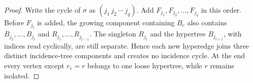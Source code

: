\documentclass[10pt,a4paper]{amsart}
\begin{document}
\begin{proof}
Write the cycle of $\sigma$ as $(j_1\,j_2\,\cdots\,j_q)$. Add
$F_{j_1},F_{j_2},\ldots,F_{j_q}$ in this order. Before $F_{j_t}$ is
added, the growing component containing $B_c$ also contains
$B_{j_2},\ldots,B_{j_t}$ and $R_{j_1},\ldots,R_{j_{t-1}}$. The singleton
$R_{j_t}$ and the hypertree $B_{j_{t+1}}$, with indices read cyclically, are
still separate. Hence each new hyperedge joins three distinct
incidence-tree components and creates no incidence cycle. At the end every
vertex except $r_c=r$ belongs to one loose hypertree, while $r$ remains
isolated.
\end{proof}
\end{document}
